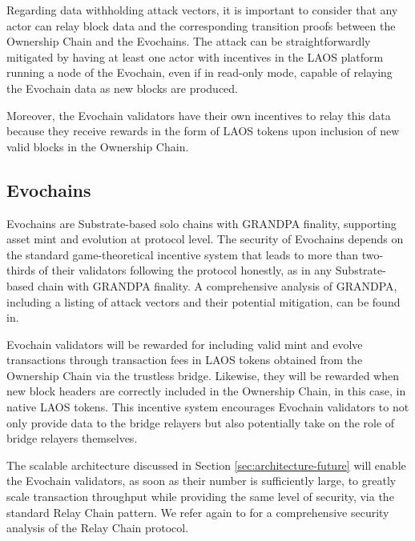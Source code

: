 Regarding data withholding attack vectors,
it is important to consider that any actor can 
relay block data and the corresponding transition proofs
between the Ownership Chain and the Evochains.
The attack can be straightforwardly mitigated by having at least one
actor with incentives in the LAOS platform running a node of the
Evochain, even if in read-only mode, capable of relaying 
the Evochain data as new blocks are produced.

Moreover, the Evochain validators have their own incentives
to relay this data because they receive rewards
in the form of LAOS tokens
upon inclusion of new valid blocks in the Ownership Chain.


\subsection{Evochains}\label{sec:security-evochains}

Evochains are Substrate-based solo chains with GRANDPA finality,
supporting asset mint and evolution at protocol level.
The security of Evochains depends
on the standard game-theoretical incentive system that
leads to more than two-thirds of their validators following
the protocol honestly,
as in any Substrate-based chain with GRANDPA finality.
A comprehensive analysis of GRANDPA, including a listing of 
attack vectors and their potential mitigation, can be found in\cite{grandpa}.

Evochain validators will be rewarded for including valid mint and evolve
transactions through transaction fees in LAOS tokens obtained from
the Ownership Chain via the trustless bridge. Likewise, they will be rewarded
when new block headers are correctly included in the Ownership Chain,
in this case, in native LAOS tokens. 
This incentive system encourages Evochain validators
to not only provide data to the bridge relayers
but also potentially take on the role of bridge relayers themselves.

The scalable architecture discussed in Section \ref{sec:architecture-future} 
will enable the Evochain validators, as soon as their number is 
sufficiently large, to greatly scale transaction throughput
while providing the same level of
security, via the standard Relay Chain pattern. We refer
again to \cite{grandpa} for a comprehensive security analysis of 
the Relay Chain protocol.






